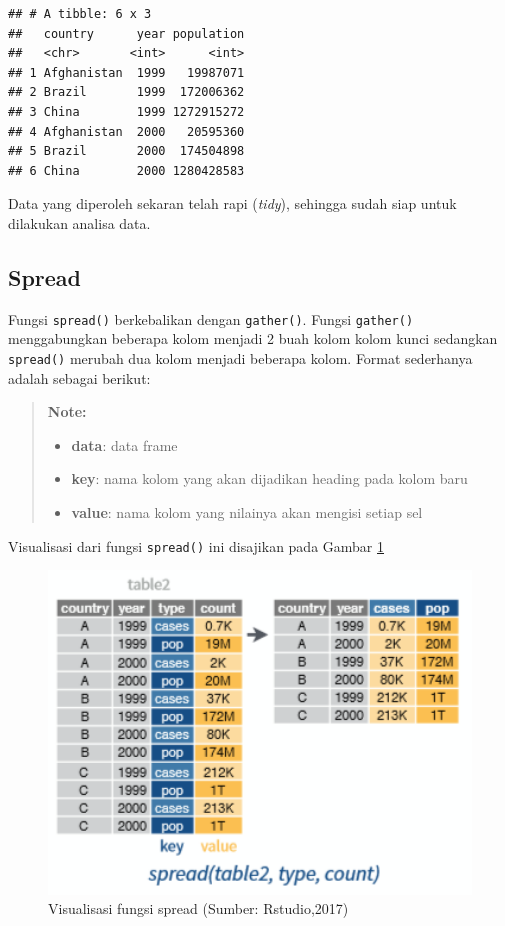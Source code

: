 \documentclass[]{book}
\providecommand{\tightlist}{%
  \setlength{\itemsep}{0pt}\setlength{\parskip}{0pt}}
\begin{document}
\begin{verbatim}
## # A tibble: 6 x 3
##   country      year population
##   <chr>       <int>      <int>
## 1 Afghanistan  1999   19987071
## 2 Brazil       1999  172006362
## 3 China        1999 1272915272
## 4 Afghanistan  2000   20595360
## 5 Brazil       2000  174504898
## 6 China        2000 1280428583
\end{verbatim}

Data yang diperoleh sekaran telah rapi (\emph{tidy}), sehingga sudah
siap untuk dilakukan analisa data.

\subsection{Spread}\label{spread}

Fungsi \texttt{spread()} berkebalikan dengan \texttt{gather()}. Fungsi
\texttt{gather()} menggabungkan beberapa kolom menjadi 2 buah kolom
kolom kunci sedangkan \texttt{spread()} merubah dua kolom menjadi
beberapa kolom. Format sederhanya adalah sebagai berikut:

\begin{quote}
\textbf{Note: }

\begin{itemize}
\tightlist
\item
  \textbf{data}: data frame
\item
  \textbf{key}: nama kolom yang akan dijadikan heading pada kolom baru
\item
  \textbf{value}: nama kolom yang nilainya akan mengisi setiap sel
\end{itemize}
\end{quote}

Visualisasi dari fungsi \texttt{spread()} ini disajikan pada Gambar
\ref{fig:spread}

\begin{figure}

{\centering \includegraphics[width=4.96in]{spread} 

}

\caption{Visualisasi fungsi spread (Sumber: Rstudio,2017)}\label{fig:spread}
\end{figure}
\end{document}
